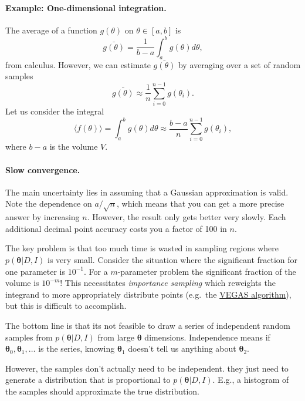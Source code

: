 \documentclass[%
oneside,                 %
final,                   %
10pt]{article}
\begin{document}
\paragraph{Example: One-dimensional integration.}
The average of a function $g(\theta)$ on $\theta \in [a,b]$ is
\[
\bar{g(\theta)} = \frac{1}{b-a} \int_a^b g(\theta) d\theta,
\]
from calculus. However, we can estimate $\bar{g(\theta)}$ by averaging over a set of random samples
\[
\bar{g(\theta)} \approx \frac{1}{n} \sum_{i=0}^{n-1} g(\theta_i).
\]
Let us consider the integral
\[
\langle f(\theta) \rangle = \int_a^b g(\theta) d\theta \approx 
\frac{b-a}{n} \sum_{i=0}^{n-1} g(\theta_i),
\]
where $b-a$ is the volume $V$.

\paragraph{Slow convergence.}
The main uncertainty lies in assuming that a Gaussian approximation is valid. Note the dependence on $a/\sqrt{n}$, which means that you can get a more precise answer by increasing $n$. However, the result only gets better very slowly. Each additional decimal point accuracy costs you a factor of 100 in $n$.

The key problem is that too much time is wasted in sampling regions where $p( \boldsymbol{\theta} |D,I )$ is very small. Consider the situation where the significant fraction for one parameter is $10^{-1}$. For a $m$-parameter problem the significant fraction of the volume is $10^{-m}$! This necessitates \emph{importance sampling} which reweights the integrand to more appropriately distribute points (e.g.~the \href{{https://en.wikipedia.org/wiki/VEGAS_algorithm}}{VEGAS algorithm}), but this is difficult to accomplish.

The bottom line is that its not feasible to draw a series of independent random samples from $p ( \boldsymbol{\theta} | D,I )$ from large $\boldsymbol{\theta}$ dimensions. Independence means if $\boldsymbol{\theta}_0, \boldsymbol{\theta}_1, \ldots$ is the series, knowing $\boldsymbol{\theta}_1$ doesn't tell us anything about $\boldsymbol{\theta}_2$.

However, the samples don't actually need to be independent. they just need to generate a distribution that is proportional to $p ( \boldsymbol{\theta} |D,I)$. E.g., a histogram of the samples should approximate the true distribution.

\end{document}

